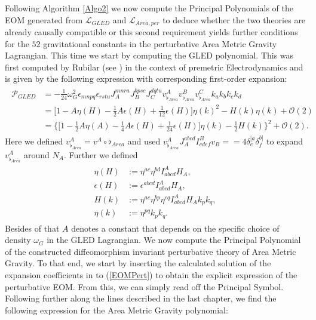 \documentclass[a4paper,12pt, DIV=14, BCOR=5mm, twoside, headsepline, numbers=noenddot]{scrbook}
\begin{document}
Following Algorithm \ref{Algo2} we now compute the Principal Polynomials of the EOM generated from $\mathcal{L}_{GLED}$ and $\mathcal{L}_{Area,per}$ to deduce whether the two theories are already causally compatible or this second requirement yields further conditions for the $52$ gravitational constants in the perturbative Area Metric Gravity Lagrangian. This time we start by computing the GLED polynomial. This was first computed by Rubilar (see \cite{2009JPhA...42U5402I}) in the context of premetric Electrodynamics and is given by the following expression with corresponding first-order expansion: 
\begin{align} \label{GLEDPoly}
\begin{aligned}
    \mathcal{P}_{GLED} &= -\frac{1}{24}\omega_G^2\epsilon_{mnpq}\epsilon_{rstu}J_A^{mnra}J_B^{bpsc}J_C^{dqtu} v_{\flat_{Area}}^A v_{\flat_{Area}}^B v_{\flat_{Area}}^C k_ak_bk_ck_d \\
                &= \bigl[ 1 -  A \eta(H)- \frac{1}{2} A \epsilon(H) + \frac{1}{12} \epsilon(H) \bigr] \eta(k)^2 - H(k)\eta(k) + \mathcal{O}(2)\\
                &= \bigl\{  \bigl[ 1 - \frac{1}{2} A \eta(A) - \frac{1}{4} A \epsilon(H) +  \frac{1}{24} \epsilon(H) \bigr] \eta(k) - \frac{1}{2} H(k)       \bigr\}^2 + \mathcal{O}(2).
\end{aligned}
\end{align}
Here we defined $v_{\flat_{Area}}^A = v^A \circ \flat_{Area}$ and used $v_{\flat_{Area}}^A J_A^{abcd} I^B_{cdef}v_B = = 4 \delta^{[a}_e \delta^{b]}_f$ to expand $v^A_{\flat_{Area}}$ around $N_A$. Further we defined
\begin{align}
\begin{aligned}
\eta(H) &:= \eta^{ac}\eta^{bd} I^A_{abcd} H_A, \\ 
\epsilon(H) &:=\epsilon^{abcd}I^A_{abcd}H_{A},\\ H(k) &:=\eta^{ac}\eta^{bp}\eta^{cq} I^A_{abcd}H_Ak_pk_q, \\ \eta(k)&:=\eta^{pq}k_pk_q.
\end{aligned}
\end{align}
Besides of that $A$ denotes a constant that depends on the specific choice of density $\omega_G$ in the GLED Lagrangian.  
We now compute the Principal Polynomial of the constructed diffeomorphism invariant perturbative theory of Area Metric Gravity. To that end, we start by inserting the calculated solution of the expansion coefficients in to (\ref{EOMPert}) to obtain the explicit expression of the perturbative EOM. From this, we can simply read off the Principal Symbol. Following further along the lines described in the last chapter, we find the following expression for the Area Metric Gravity polynomial:
\end{document}
